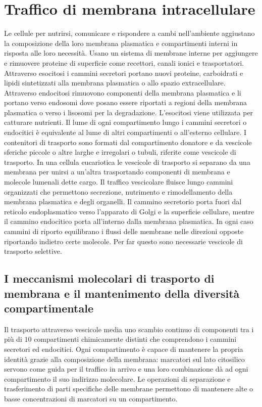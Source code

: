 \chapter{Traffico di membrana intracellulare}
Le cellule per nutrirsi, comunicare e rispondere a cambi nell'ambiente aggiustano la composizione della loro membrana plasmatica e compartimenti interni in risposta alle loro 
necessit\`a. Usano un sistema di membrane interne per aggiungere e rimuovere proteine di superficie come recettori, canali ionici e trasportatori. Attraverso esocitosi i cammini 
secretori portano nuovi proteine, carboidrati e lipidi sintetizzati alla membrana plasmatica o allo spazio extracellulare. Attraverso endocitosi rimuovono componenti della membrana 
plasmatica e li portano verso endosomi dove posano essere riportati a regioni della membrana plasmatica o verso i lisosomi per la degradazione. L'esocitosi viene utilizzata per 
catturare nutrienti. Il lume di ogni compartimento lungo i cammini secretori o endocitici \`e equivalente al lume di altri compartimenti o all'esterno cellulare. I contenitori
di trasporto sono formati dal compartimento donatore e da vescicole sferiche piccole o altre larghe e irregolari o tubuli, riferite come vescicole di trasporto. In una cellula 
eucariotica le vescicole di trasporto si separano da una membrana per unirsi a un'altra trasportando componenti di membrana e molecole lumenali dette cargo. Il traffico vescicolare
fluisce lungo cammini organizzati che permettono secrezione, nutrimento e rimodellamento della membrana plasmatica e degli organelli. Il cammino secretorio porta fuori dal reticolo 
endoplasmatico verso l'apparato di Golgi e la superficie cellulare, mentre il cammino endocitico porta all'interno dalla membrana plasmatica. In ogni caso cammini di riporto equilibrano
i flussi delle membrane nelle direzioni opposte riportando indietro certe molecole. Per far questo sono necessarie vescicole di trasporto selettive. 
\section{I meccanismi molecolari di trasporto di membrana e il mantenimento della diversit\`a compartimentale}
Il trasporto attraverso vescicole media uno scambio continuo di componenti tra i pi\`u di $10$ compartimenti chimicamente distinti che comprendono i cammini secretori ed endocitici. 
Ogni compartimento \`e capace di mantenere la propria identit\`a grazie alla composizione della membrana: marcatori sul lato citosilico servono come guida per il traffico in arrivo e 
una loro combinazione d\`a ad ogni compartimento il suo indirizzo molecolare. Le operazioni di separazione e trasferimento di parti specifiche delle membrane permettono di mantenere
alte o basse concentrazioni di marcatori su un compartimento. 
